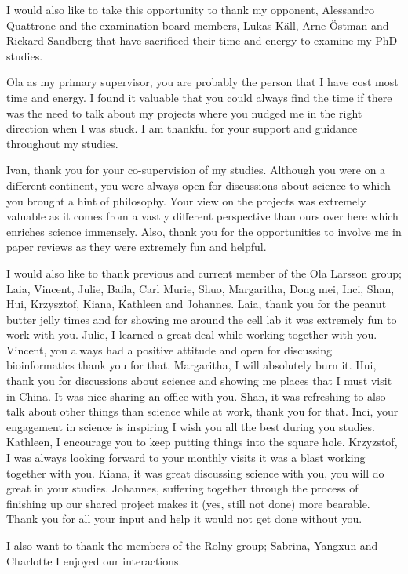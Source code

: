 \documentclass[
  12pt,
  openany]{book}
\begin{document}
I would also like to take this opportunity to thank my opponent, Alessandro Quattrone and the examination board members, Lukas Käll, Arne Östman and Rickard Sandberg that have sacrificed their time and energy to examine my PhD studies.

Ola as my primary supervisor, you are probably the person that I have cost most time and energy. I found it valuable that you could always find the time if there was the need to talk about my projects where you nudged me in the right direction when I was stuck. I am thankful for your support and guidance throughout my studies.

Ivan, thank you for your co-supervision of my studies. Although you were on a different continent, you were always open for discussions about science to which you brought a hint of philosophy. Your view on the projects was extremely valuable as it comes from a vastly different perspective than ours over here which enriches science immensely. Also, thank you for the opportunities to involve me in paper reviews as they were extremely fun and helpful.

I would also like to thank previous and current member of the Ola Larsson group; Laia, Vincent, Julie, Baila, Carl Murie, Shuo, Margaritha, Dong mei, Inci, Shan, Hui, Krzysztof, Kiana, Kathleen and Johannes.
Laia, thank you for the peanut butter jelly times and for showing me around the cell lab it was extremely fun to work with you. Julie, I learned a great deal while working together with you. Vincent, you always had a positive attitude and open for discussing bioinformatics thank you for that. Margaritha, I will absolutely burn it. Hui, thank you for discussions about science and showing me places that I must visit in China. It was nice sharing an office with you. Shan, it was refreshing to also talk about other things than science while at work, thank you for that. Inci, your engagement in science is inspiring I wish you all the best during you studies. Kathleen, I encourage you to keep putting things into the square hole. Krzyzstof, I was always looking forward to your monthly visits it was a blast working together with you. Kiana, it was great discussing science with you, you will do great in your studies. Johannes, suffering together through the process of finishing up our shared project makes it (yes, still not done) more bearable. Thank you for all your input and help it would not get done without you.

I also want to thank the members of the Rolny group; Sabrina, Yangxun and Charlotte I enjoyed our interactions.
\end{document}
